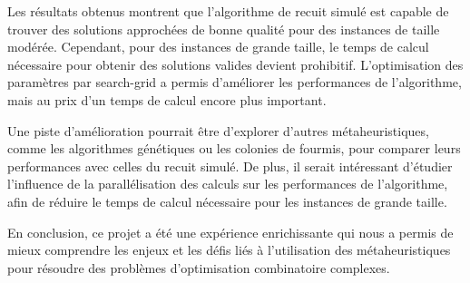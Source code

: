\documentclass[a4paper, 12pt]{article}
\begin{document}
Les résultats obtenus montrent que l'algorithme de recuit simulé est capable de trouver des solutions approchées de bonne qualité pour des instances de taille modérée. Cependant, pour des instances de grande taille, le temps de calcul nécessaire pour obtenir des solutions valides devient prohibitif. L'optimisation des paramètres par search-grid a permis d'améliorer les performances de l'algorithme, mais au prix d'un temps de calcul encore plus important.

Une piste d'amélioration pourrait être d'explorer d'autres métaheuristiques, comme les algorithmes génétiques ou les colonies de fourmis, pour comparer leurs performances avec celles du recuit simulé. De plus, il serait intéressant d'étudier l'influence de la parallélisation des calculs sur les performances de l'algorithme, afin de réduire le temps de calcul nécessaire pour les instances de grande taille.

En conclusion, ce projet a été une expérience enrichissante qui nous a permis de mieux comprendre les enjeux et les défis liés à l'utilisation des métaheuristiques pour résoudre des problèmes d'optimisation combinatoire complexes.
\end{document}
